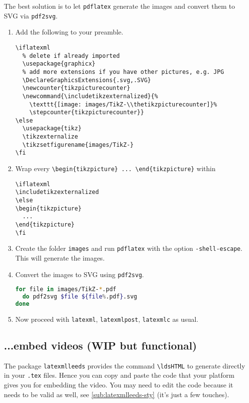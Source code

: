 \documentclass[a4paper]{article}
\def\ltxinline{\lstinline[style=latexml]}
\theoremstyle{definition}
\begin{document}
The best solution is to let \verb|pdflatex| generate the images and convert them to SVG via \verb|pdf2svg|.
\begin{enumerate}
  \item Add the following to your preamble.
    \begin{lstlisting}[style=latexml]
\iflatexml
  % delete if already imported
  \usepackage{graphicx}
  % add more extensions if you have other pictures, e.g. JPG
  \DeclareGraphicsExtensions{.svg,.SVG}
  \newcounter{tikzpicturecounter}
  \newcommand{\includetikzexternalized}{%
    \texttt{[image: images/TikZ-\\thetikzpicturecounter]}%
    \stepcounter{tikzpicturecounter}}
\else
  \usepackage{tikz}
  \tikzexternalize
  \tikzsetfigurename{images/TikZ-}
\fi
    \end{lstlisting}
  \item  Wrap every \ltxinline|\begin{tikzpicture} ... \end{tikzpicture}| within
  \begin{lstlisting}[style=latexml]
\iflatexml
\includetikzexternalized
\else
\begin{tikzpicture}
  ...
\end{tikzpicture}
\fi
  \end{lstlisting}
  \item Create the folder \verb|images| and run \verb|pdflatex| with the option \verb|-shell-escape|. This will generate the images.

  \item Convert the images to SVG using \verb|pdf2svg|.
    \begin{lstlisting}[language=bash]
for file in images/TikZ-*.pdf
  do pdf2svg $file ${file%.pdf}.svg
done
    \end{lstlisting}
  \item Now proceed with \verb|latexml|, \verb|latexmlpost|, \verb|latexmlc| as usual.
\end{enumerate}

\subsection{...embed videos (WIP but functional)}
The package \verb|latexmlleeds| provides the command \ltxinline|\ldsHTML| to generate \HTML{} directly in your \verb|.tex| files. Hence you can copy and paste the \HTML{} code that your platform gives you for embedding the video. You may need to edit the \HTML{} code because it needs to be valid \XML{} as well, see \autoref{sub:latexmlleeds-sty} (it's just a few touches).
\end{document}
